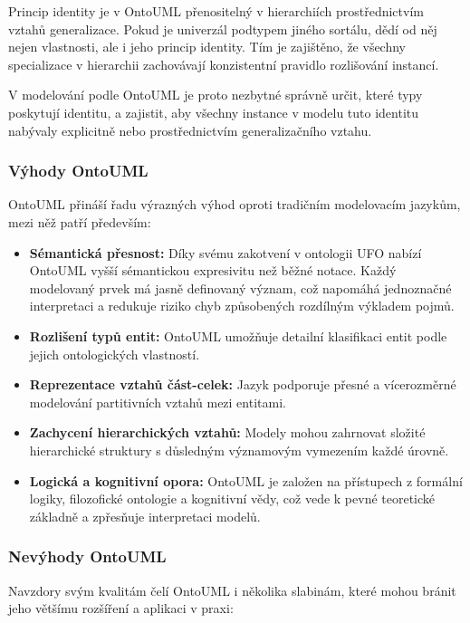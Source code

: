 Princip identity je v OntoUML přenositelný v hierarchiích prostřednictvím vztahů generalizace. Pokud je univerzál podtypem jiného sortálu, dědí od něj nejen vlastnosti, ale i jeho princip identity. Tím je zajištěno, že všechny specializace v hierarchii zachovávají konzistentní pravidlo rozlišování instancí. \cite{Rybola2017}

V modelování podle OntoUML je proto nezbytné správně určit, které typy poskytují identitu, a zajistit, aby všechny instance v modelu tuto identitu nabývaly explicitně nebo prostřednictvím generalizačního vztahu. \cite{KOM_prezentace2}


\subsubsection{Výhody OntoUML}
\label{sec:výhody-ontouml}
OntoUML přináší řadu výrazných výhod oproti tradičním modelovacím jazykům, mezi něž patří především:
\begin{itemize}
  \item \textbf{Sémantická přesnost:} Díky svému zakotvení v ontologii UFO nabízí OntoUML vyšší sémantickou expresivitu než běžné notace. Každý modelovaný prvek má jasně definovaný význam, což napomáhá jednoznačné interpretaci a redukuje riziko chyb způsobených rozdílným výkladem pojmů.
  \item \textbf{Rozlišení typů entit:} OntoUML umožňuje detailní klasifikaci entit podle jejich ontologických vlastností.
  \item \textbf{Reprezentace vztahů část-celek:} Jazyk podporuje přesné a vícerozměrné modelování partitivních vztahů mezi entitami.
  \item \textbf{Zachycení hierarchických vztahů:} Modely mohou zahrnovat složité hierarchické struktury s důsledným významovým vymezením každé úrovně.
  \item \textbf{Logická a kognitivní opora:} OntoUML je založen na přístupech z formální logiky, filozofické ontologie a kognitivní vědy, což vede k pevné teoretické základně a zpřesňuje interpretaci modelů. \cite{CCMi_ontouml}
\end{itemize}


\subsubsection{Nevýhody OntoUML}
\label{sec:nevýhody-ontouml}
Navzdory svým kvalitám čelí OntoUML i několika slabinám, které mohou bránit jeho většímu rozšíření a aplikaci v praxi:

